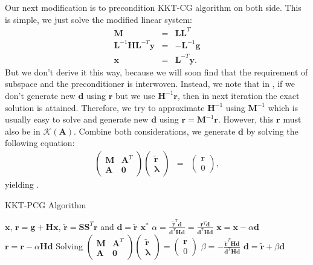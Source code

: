 \documentclass[annual]{acmsiggraph}
\newcommand{\E}[1]{\mathbf{#1}}
\newcommand{\TWOC}[2]{\left(\begin{array}{c}#1 \\ #2\end{array}\right)}
\newcommand{\MTT}[4]{\left(\begin{array}{cc}#1 & #2 \\ #3 & #4\end{array}\right)}
\begin{document}
Our next modification is to precondition KKT-CG algorithm on both side. This is simple, we just solve the modified linear system:
\begin{eqnarray*}
\E{M}&=&\E{L}\E{L}^T	\\
\E{L}^{-1}\E{H}\E{L}^{-T}\E{y}&=&-\E{L}^{-1}\E{g}	\\
\E{x}&=&\E{L}^{-T}\E{y}.
\end{eqnarray*}
But we don't derive it this way, because we will soon find that the requirement of subspace and the preconditioner is interwoven. Instead, we note that in , if we don't generate new $\E{d}$ using $\E{r}$ but we use $\E{H}^{-1}\E{r}$, then in next iteration the exact solution is attained. Therefore, we try to approximate $\E{H}^{-1}$ using $\E{M}^{-1}$ which is usually easy to solve and generate new $\E{d}$ using $\E{r}=\E{M}^{-1}\E{r}$. However, this $\E{r}$ must also be in $\mathcal{K}(\E{A})$. Combine both considerations, we generate $\E{d}$ by solving the following equation:
\begin{eqnarray*}
\MTT{\E{M}}{\E{A}^T}{\E{A}}{\E{0}}\TWOC{\tilde{\E{r}}}{\E{\lambda}}&=&\TWOC{\E{r}}{0},
\end{eqnarray*}
yielding .
\begin{algorithm}[h]
\caption{KKT-PCG Algorithm}
\label{alg:KKTPCG}
\begin{algorithmic}
\REQUIRE $\E{x}$, $\E{r}=\E{g}+\E{H}\E{x}$, $\tilde{\E{r}}=\E{S}\E{S}^T\E{r}$ and $\E{d}=\tilde{\E{r}}$
\ENSURE $\E{x}^*$
\WHILE{$\|\tilde{\E{r}}\|$ not small}
\STATE $\alpha=\frac{\tilde{\E{r}}^T\E{d}}{\E{d}^T\E{H}\E{d}}=\frac{\E{r}^T\E{d}}{\E{d}^T\E{H}\E{d}}$
\STATE $\E{x}=\E{x}-\alpha\E{d}$
\STATE $\E{r}=\E{r}-\alpha\E{H}\E{d}$
\STATE Solving $\MTT{\E{M}}{\E{A}^T}{\E{A}}{\E{0}}\TWOC{\tilde{\E{r}}}{\E{\lambda}}=\TWOC{\E{r}}{0}$
\STATE $\beta=-\frac{\tilde{\E{r}}^T\E{H}\E{d}}{\E{d}^T\E{H}\E{d}}$
\STATE $\E{d}=\tilde{\E{r}}+\beta\E{d}$
\ENDWHILE
\end{algorithmic}
\end{algorithm}
\end{document}
